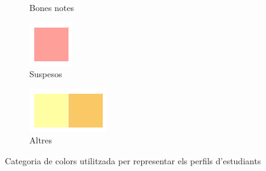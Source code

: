 \documentclass[12pt,a4paper,catalan]{article}
\begin{document}
\begin{figure}[h]
\begin{subfigure}{.2\textwidth}
  \caption{Bones notes}
\end{subfigure}
\begin{subfigure}{.2\textwidth}
  \centering
  \includegraphics[width=\linewidth]{img/suspesos.png}
  \caption{Suspesos}
\end{subfigure}
\begin{subfigure}{.2\textwidth}
  \centering
  \includegraphics[width=\linewidth]{img/altresperfils.png}
  \caption{Altres}
\end{subfigure}
\caption{Categoria de colors utilitzada per representar els perfils d'estudiants}
\label{fig:colorsperfils}
\end{figure}
\end{document}
